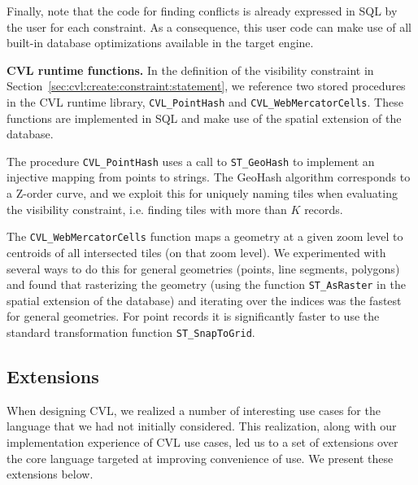 \documentclass[11pt, oneside]{report}
\newcommand{\minisec}[1]{\noindent\textbf{#1.}}
\begin{document}
{Finally, note that the code for finding conflicts is already expressed in SQL by the user for each constraint. As a consequence, this user code can make use of all built-in database optimizations available in the target engine.

\minisec{CVL runtime functions}
In the definition of the visibility constraint in Section~\ref{sec:cvl:create:constraint:statement}, we reference two stored procedures in the CVL runtime library, \texttt{CVL\_PointHash} and \texttt{CVL\_WebMercatorCells}. These functions are implemented in SQL and make use of the spatial extension of the database.

The procedure \texttt{CVL\_PointHash} uses a call to \texttt{ST\_GeoHash} to implement an injective mapping from points to strings. The GeoHash algorithm corresponds to a Z-order curve, and we exploit this for uniquely naming tiles when evaluating the visibility constraint, i.e. finding tiles with more than $K$ records.

The \texttt{CVL\_WebMercatorCells} function maps a geometry at a given zoom level to centroids of all intersected tiles (on that zoom level). We experimented with several ways to do this for general geometries (points, line segments, polygons) and found that rasterizing the geometry (using the function \texttt{ST\_AsRaster} in the spatial extension of the database) and iterating over the indices was the fastest for general geometries. For point records it is significantly faster to use the standard transformation function \texttt{ST\_SnapToGrid}.


\subsection{Extensions}
\label{sec:implementation:extensions}

When designing CVL, we realized a number of interesting use cases for the language that we had not initially considered. This realization, along with our implementation experience of CVL use cases, led us to a set of extensions over the core language targeted at improving convenience of use. We present these extensions below.

}
\end{document}
